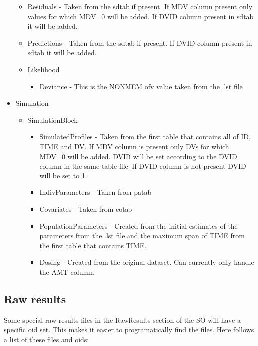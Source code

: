 \begin{itemize}
\begin{itemize}
            \item Residuals - Taken from the sdtab if present. If MDV column present only values for which MDV=0 will be added. If DVID column present in sdtab it will be added.
            \item Predictions - Taken from the sdtab if present. If DVID column present in sdtab it will be added.
            \item Likelihood
                \begin{itemize}
                    \item Deviance - This is the NONMEM ofv value taken from the .lst file
                \end{itemize}
        \end{itemize}
    \item Simulation 
        \begin{itemize}
            \item SimulationBlock    
            \begin{itemize}
                \item SimulatedProfiles - Taken from the first table that contains all of ID, TIME and DV. If MDV column is present only DVs for which MDV=0 will be added. DVID will be set according to the DVID column in the same table file. If DVID column is not present DVID will be set to 1.
                \item IndivParameters - Taken from patab
                \item Covariates - Taken from cotab
                \item PopulationParameters - Created from the initial estimates of the parameters from the .lst file and the maxímum span of TIME from the first table that contains TIME.
                \item Dosing - Created from the original dataset. Can currently only handle the AMT column.
            \end{itemize}
        \end{itemize}
\end{itemize}

\subsection{Raw results}
Some special raw results files in the RawResults section of the SO will have a specific oid set. This makes it easier to programatically find the files. Here follows a list of these files and oids:

